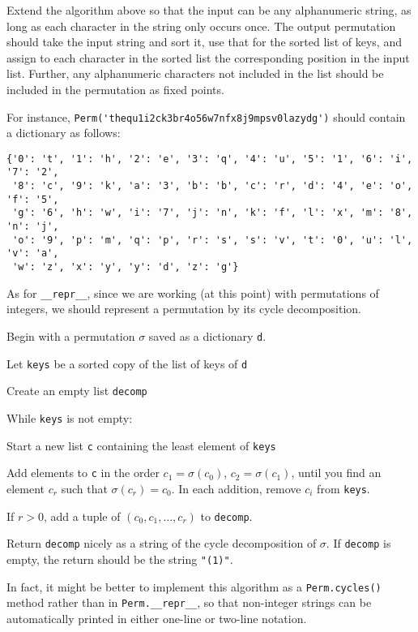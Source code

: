 \documentclass[m3380-lec-main.tex]{subfiles}
\begin{document}
\begin{exc} Extend the algorithm above so that the input can be any alphanumeric string, as long as each character in the string only occurs once. The output permutation should take the input string and sort it, use that for the sorted list of keys, and assign to each character in the sorted list the corresponding position in the input list. Further, any alphanumeric characters not included in the list should be included in the permutation as fixed points.

For instance, \verb|Perm('thequ1i2ck3br4o56w7nfx8j9mpsv0lazydg')| should contain a dictionary as follows:

\bc\begin{verbatim}
{'0': 't', '1': 'h', '2': 'e', '3': 'q', '4': 'u', '5': '1', '6': 'i', '7': '2', 
 '8': 'c', '9': 'k', 'a': '3', 'b': 'b', 'c': 'r', 'd': '4', 'e': 'o', 'f': '5', 
 'g': '6', 'h': 'w', 'i': '7', 'j': 'n', 'k': 'f', 'l': 'x', 'm': '8', 'n': 'j', 
 'o': '9', 'p': 'm', 'q': 'p', 'r': 's', 's': 'v', 't': '0', 'u': 'l', 'v': 'a', 
 'w': 'z', 'x': 'y', 'y': 'd', 'z': 'g'}
\end{verbatim}
\ec
\end{exc}

As for \verb|__repr__|, since we are working (at this point) with permutations of integers, we should represent a permutation by its cycle decomposition.

\begin{alg}
Begin with a permutation $\sigma$ saved as a dictionary \verb|d|.
\begin{enum}
\item Let \verb|keys| be a sorted copy of the list of keys of \verb|d|
\item Create an empty list \verb|decomp|
\item While \verb|keys| is not empty:
\begin{enuma}
\item Start a new list \verb|c| containing the least element of \verb|keys|
\item Add elements to \verb|c| in the order $c_1=\sigma(c_0)$, $c_2=\sigma(c_1)$, until you find an element $c_r$ such that $\sigma(c_r)=c_0$. In each addition, remove $c_i$ from \verb|keys|.
\item If $r>0$, add a tuple of $(c_0,c_1,\ldots,c_r)$ to \verb|decomp|.
\end{enuma}
\item Return \verb|decomp| nicely as a string of the cycle decomposition of $\sigma$. If \verb|decomp| is empty, the return should be the string \verb|"(1)"|.
\end{enum}
\end{alg}
In fact, it might be better to implement this algorithm as a \verb|Perm.cycles()| method rather than in \verb|Perm.__repr__|, so that non-integer strings can be automatically printed in either one-line or two-line notation.
\end{document}

